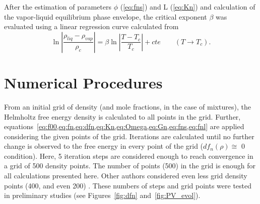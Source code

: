 \documentclass[preprint,12pt,3p]{elsarticle}
\begin{document}
\begin{table}[h!]
\centering
\caption{Experimental critical data obtained from NIST database \cite{nistfluids} and used as reference}
\label{table:crit_exp}
\end{table}

    After the estimation of parameters $\phi$ (\cref{eq:fns}) and L (\cref{eq:Kn}) and calculation of the vapor-liquid equilibrium phase envelope, the critical exponent $\beta$ was evaluated using a linear regression curve calculated from
\begin{equation} \label{eq:beta_law}
    \ln\left|\frac{\rho_{liq}-\rho_{vap}}{\rho_{c}}\right| = \beta \ln\left|\frac{T-T_{c}}{T_{c}}\right|+cte \qquad (T \rightarrow T_{c}).
\end{equation}

\section{Numerical Procedures}
    From an initial grid of density (and mole fractions, in the case of mixtures), the Helmholtz free energy density is calculated to all points in the grid. Further, equations~\cref{eq:f00,eq:fn,eq:dfn,eq:Kn,eq:Omega,eq:Gn,eq:fns,eq:fnl} are applied considering the given points of the grid. Iterations are calculated until no further change is observed to the free energy in every point of the grid ($df_{n}(\rho) \cong$ 0 condition). Here, 5 iteration steps are considered enough to reach convergence in a grid of 500 density points. The number of points (500) in the grid is enough for all calculations presented here. Other authors considered even less grid density points (400, and even 200) \cite{cai2004thermodynamics}. These numbers of steps and grid points were tested in preliminary studies (see Figures~\ref{fig:dfn} and~\ref{fig:PV_evol}).
\end{document}

